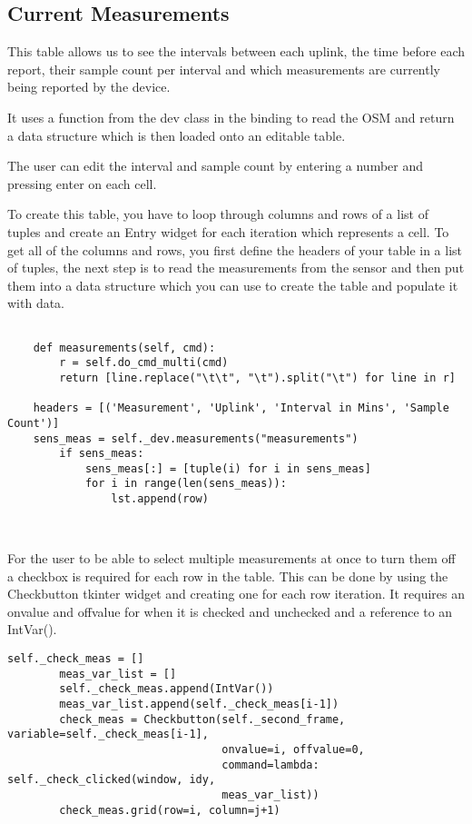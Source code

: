\documentclass[a4paper,12pt, notitlepage]{article}
\begin{document}
\subsection{Current Measurements}

This table allows us to see the intervals between each uplink, the time before each report, their sample count per interval and which measurements are currently being reported by the device.

It uses a function from the dev class in the binding to read the OSM and return a data structure which is then loaded onto an editable table.

The user can edit the interval and sample count by entering a number and pressing enter on each cell.

To create this table, you have to loop through columns and rows of a list of tuples and create an Entry widget for each iteration which represents a cell. To get all of the columns and rows, you first define the headers of your table in a list of tuples, the next step is to read the measurements from the sensor and then put them into a data structure which you can use to create the table and populate it with data.
\begin{lstlisting}[caption={A snippet of how the measurements table is created.},label={lst: exampMeas}]

    def measurements(self, cmd):
        r = self.do_cmd_multi(cmd)
        return [line.replace("\t\t", "\t").split("\t") for line in r]
        
    headers = [('Measurement', 'Uplink', 'Interval in Mins', 'Sample Count')]
    sens_meas = self._dev.measurements("measurements")
        if sens_meas:
            sens_meas[:] = [tuple(i) for i in sens_meas]
            for i in range(len(sens_meas)):
                lst.append(row)

       
\end{lstlisting}

For the user to be able to select multiple measurements at once to turn them off a checkbox is required for each row in the table. This can be done by using the Checkbutton tkinter widget and creating one for each row iteration. It requires an onvalue and offvalue for when it is checked and unchecked and a reference to an IntVar().

\begin{lstlisting}[caption={Creating a checkbutton to select a row in current measurements},label={lst: exampCheck}]
        self._check_meas = []
        meas_var_list = []
        self._check_meas.append(IntVar())
        meas_var_list.append(self._check_meas[i-1])
        check_meas = Checkbutton(self._second_frame, variable=self._check_meas[i-1],
                                 onvalue=i, offvalue=0,
                                 command=lambda: self._check_clicked(window, idy,
                                 meas_var_list))
        check_meas.grid(row=i, column=j+1)
\end{lstlisting}
\newpage
\end{document}
